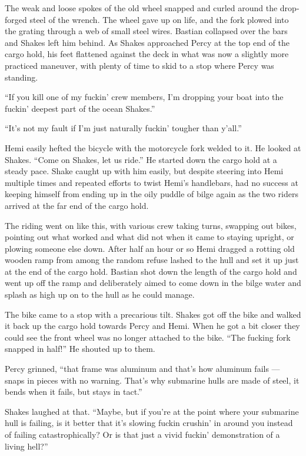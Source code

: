 \documentclass[]{scrbook}
\begin{document}
The weak and loose spokes of the old wheel snapped and curled around the
drop-forged steel of the wrench. The wheel gave up on life, and the fork
plowed into the grating through a web of small steel wires. Bastian
collapsed over the bars and Shakes left him behind. As Shakes approached
Percy at the top end of the cargo hold, his feet flattened against the
deck in what was now a slightly more practiced maneuver, with plenty of
time to skid to a stop where Percy was standing.

``If you kill one of my fuckin' crew members, I'm dropping your boat
into the fuckin' deepest part of the ocean Shakes.''

``It's not my fault if I'm just naturally fuckin' tougher than y'all.''

Hemi easily hefted the bicycle with the motorcycle fork welded to it. He
looked at Shakes. ``Come on Shakes, let us ride.'' He started down the
cargo hold at a steady pace. Shake caught up with him easily, but
despite steering into Hemi multiple times and repeated efforts to twist
Hemi's handlebars, had no success at keeping himself from ending up in
the oily puddle of bilge again as the two riders arrived at the far end
of the cargo hold.

The riding went on like this, with various crew taking turns, swapping
out bikes, pointing out what worked and what did not when it came to
staying upright, or plowing someone else down. After half an hour or so
Hemi dragged a rotting old wooden ramp from among the random refuse
lashed to the hull and set it up just at the end of the cargo hold.
Bastian shot down the length of the cargo hold and went up off the ramp
and deliberately aimed to come down in the bilge water and splash as
high up on to the hull as he could manage.

The bike came to a stop with a precarious tilt. Shakes got off the bike
and walked it back up the cargo hold towards Percy and Hemi. When he got
a bit closer they could see the front wheel was no longer attached to
the bike. ``The fucking fork snapped in half!'' He shouted up to them.

Percy grinned, ``that frame was aluminum and that's how aluminum fails
--- snaps in pieces with no warning. That's why submarine hulls are made
of steel, it bends when it fails, but stays in tact.''

Shakes laughed at that. ``Maybe, but if you're at the point where your
submarine hull is failing, is it better that it's slowing fuckin
crushin' in around you instead of failing catastrophically? Or is that
just a vivid fuckin' demonstration of a living hell?''
\end{document}
